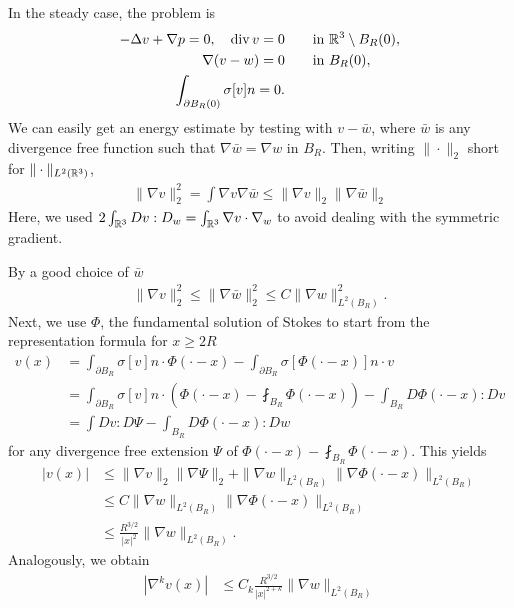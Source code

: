\documentclass[abstracton, paper=a4, fontsize=11pt,DIV=12,bibliography=totoc]{scrartcl}
\begin{document}
In the steady case, the problem is
\begin{align}
   -  \Delta v + \nabla p = 0, \quad \operatorname{div}  v = 0 & \qquad  \text{in } \mathbb{R}^3 \setminus B_R(0), \\
    \nabla (v - w) = 0   & \qquad  \text{in } B_R(0), \\
    \int_{\partial B_R(0)} \sigma[ v] n = 0.
\end{align}
We can easily get an energy estimate by testing with $v-\bar w$, where $\bar w$ is any divergence free function such that $\nabla \bar w = \nabla w $ in $B_R$. Then, writing $\|\cdot\|_2$ short for $\|\cdot\|_{L^2(\mathbb{R}^3)}$,  
\begin{align*}
    \|\nabla v\|_2^2 = \int \nabla v \nabla \bar w \leq \|\nabla v\|_2 \|\nabla \bar w\|_2
\end{align*}
Here, we used $2 \int_{\mathbb{R}^3} D v : D_w = \int_{\mathbb{R}^3} \nabla v \cdot \nabla_w$ to avoid dealing with the symmetric gradient.

By a good choice of $\bar w$
\begin{align*}
    \|\nabla v\|_2^2 \leq \|\nabla \bar w\|_2^2 \leq C \|\nabla w\|_{L^2(B_R)}^2.
\end{align*}
Next, we use $\Phi$, the fundamental solution of Stokes to start from the representation formula for $x \geq 2R$
\begin{align*}
    v(x) &= \int_{\partial B_R} \sigma[v]n \cdot \Phi(\cdot - x) - \int_{\partial B_R} \sigma[\Phi(\cdot - x)] n \cdot v \\
   & = \int_{\partial B_R} \sigma[v]n \cdot \left(\Phi(\cdot - x) - \fint_{    B_R} \Phi(\cdot - x)\right) - \int_{B_R} D \Phi(\cdot - x) : D v \\
    &= \int Dv \colon D \Psi - \int_{B_R} D \Phi(\cdot - x) : D w
\end{align*}
for any divergence free extension $\Psi$ of $\Phi(\cdot - x) - \fint_{    B_R} \Phi(\cdot - x)$. This yields
\begin{align}
    |v(x)| &\leq \|\nabla v\|_2 \|\nabla \Psi\|_2  + \|\nabla w\|_{L^2(B_R)} \|\nabla \Phi(\cdot - x)\|_{L^2(B_R)} \\
    & \leq C \|\nabla w\|_{L^2(B_R)} \|\nabla \Phi(\cdot - x)\|_{L^2(B_R)} \\
    & \leq \frac{R^{3/2}}{|x|^2} \|\nabla w\|_{L^2(B_R)}.
\end{align}
Analogously, we obtain
\begin{align}
    |\nabla^k v(x)| &\leq C_k  \frac{R^{3/2}}{|x|^{2+k}} \|\nabla w\|_{L^2(B_R)}
\end{align}
\end{document}
